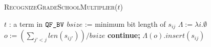 \begin{algorithm}[t]
 \caption{\textsc{RecognizeGradeSchoolMultiplier}($t$)}
 \label{alg:hb}
 \begin{algorithmic}[1]
   \Ensure $t$ : a term in $\texttt{QF\_BV}$
   \State $bsize$ :=  minimum bit length of $s_{ij}$
   \State $\Lambda := \lambda i. \emptyset$
   \State $o := (\sum_{j' < j} len( s_{ij'}))/bsize$
    {\bf continue;}
    $\Lambda(o).insert( s_{ij})$
   \Else~
   \EndIf
   \EndFor
   \State {}
   \EndIf
   \State {}
 \end{algorithmic}
\end{algorithm}  



